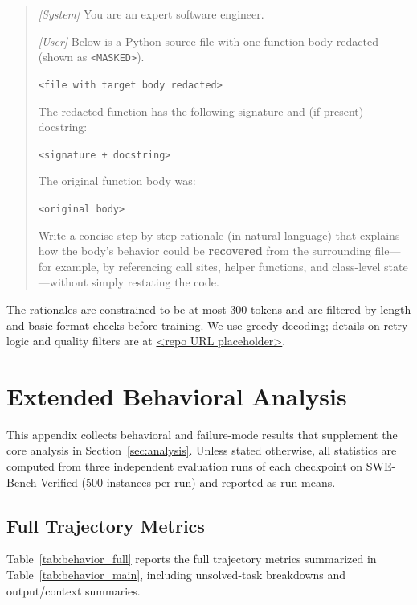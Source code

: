\begin{quote}\small
\textit{[System]} You are an expert software engineer.

\noindent\textit{[User]} Below is a Python source file with one function
body redacted (shown as \texttt{<MASKED>}).
\medskip

\noindent\texttt{<file with target body redacted>}
\medskip

\noindent The redacted function has the following signature and (if
present) docstring:
\medskip

\noindent\texttt{<signature + docstring>}
\medskip

\noindent The original function body was:
\medskip

\noindent\texttt{<original body>}
\medskip

\noindent Write a concise step-by-step rationale (in natural language)
that explains how the body's behavior could be \textbf{recovered} from
the surrounding file---for example, by referencing call sites, helper
functions, and class-level state---without simply restating the code.
\end{quote}

The rationales are constrained to be at most $300$ tokens and are
filtered by length and basic format checks before training. We use
greedy decoding; details on retry logic and quality filters are at
\textcolor{red}{\url{<repo URL placeholder>}}.


\section{Extended Behavioral Analysis}
\label{app:behavior_extra}

This appendix collects behavioral and failure-mode results that
supplement the core analysis in Section~\ref{sec:analysis}. Unless stated
otherwise, all statistics are computed from three independent evaluation
runs of each checkpoint on SWE-Bench-Verified ($500$ instances per run)
and reported as run-means.

\subsection{Full Trajectory Metrics}
\label{app:behavior_extra:metrics}

Table~\ref{tab:behavior_full} reports the full trajectory metrics
summarized in Table~\ref{tab:behavior_main}, including unsolved-task
breakdowns and output/context summaries.


